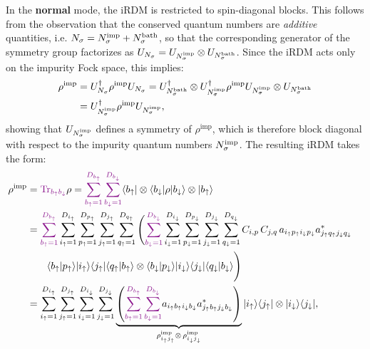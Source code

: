 \documentclass[edipack_sp.tex]{subfiles}
\begin{document}
In the {\bf normal} mode, the iRDM is restricted to 
{spin-diagonal} blocks. This follows from the observation 
that the conserved quantum numbers are 
\emph{additive} quantities, i.e. 
$N_\sigma = N_\sigma^\mathrm{imp} + N_\sigma^\mathrm{bath}$,
so that the corresponding generator of the symmetry group factorizes as
$U_{N_\sigma} = U_{N_\sigma^\mathrm{imp}} \otimes U_{N_\sigma^\mathrm{bath}}$. 
Since the iRDM acts only on the impurity Fock space, this implies:
\begin{equation}
\begin{aligned}
\rho^\mathrm{imp} &= U_{N_\sigma}^\dagger \rho^\mathrm{imp} U_{N_\sigma} = 
U_{N_\sigma^\mathrm{bath}}^\dagger \otimes U_{N_\sigma^\mathrm{imp}}^\dagger 
\rho^\mathrm{imp} 
U_{N_\sigma^\mathrm{imp}} \otimes U_{N_\sigma^\mathrm{bath}} \\
&= 
U_{N_\sigma^\mathrm{imp}}^\dagger \rho^\mathrm{imp} U_{N_\sigma^\mathrm{imp}},
\end{aligned}
\end{equation}
showing that $U_{N_\sigma^\mathrm{imp}}$ defines a symmetry of 
$\rho^\mathrm{imp}$, which is therefore block diagonal with respect to 
the impurity quantum numbers $N_\sigma^\mathrm{imp}$.
The resulting iRDM takes the form:
\begin{equation}
  \label{iRDMnormal}
  \begin{aligned}
  \rho^\mathrm{imp} &= {\color{Plum}\Tr_{b_\up b_\dw}}{\rho} = 
  {\color{Plum}
  \sum_{b_\up=1}^{D_{b_\up}}
  \sum_{b_\dw=1}^{D_{b_\dw}}
  }
  \bra{b_\up}\otimes\bra{b_\dw}
    \rho
    \ket{b_\dw}\otimes\ket{b_\up}    \cr
    &=
    {\color{Plum}
    \sum_{b_\up=1}^{D_{b_\up}}
    }
    \sum_{i_\up=1}^{D_{i_\up}}
    \sum_{p_\up=1}^{D_{p_\up}}
    \sum_{j_\up=1}^{D_{j_\up}} 
    \sum_{q_\up=1}^{D_{q_\up}}
    \Bigg(    
    {\color{Plum}
    \sum_{b_\dw=1}^{D_{b_\dw}}
    }
    \sum_{i_\dw=1}^{D_{i_\dw}}
    \sum_{p_\dw=1}^{D_{p_\dw}}
    \sum_{j_\dw=1}^{D_{j_\dw}} 
    \sum_{q_\dw=1}^{D_{q_\dw}}
    C_{i,p}\,C_{j,q}\,a_{i_\up p_\up i_\dw p_\dw} a^*_{j_\up q_\up j_\dw q_\dw} \cr
    &\qquad    
    \langle b_\up| p_\up\rangle| i_\up\rangle\langle j_\up |\langle q_\up| b_\up\rangle   \otimes \langle b_\dw| p_\dw \rangle|i_\dw\rangle \langle j_\dw  |\langle q_\dw| b_\dw\rangle \Bigg)
    \cr
&=
    \sum_{i_\up=1}^{D_{i_\up}}
    \sum_{j_\up=1}^{D_{j_\up}}
    \sum_{i_\dw=1}^{D_{i_\dw}}
    \sum_{j_\dw=1}^{D_{j_\dw}}
    \underbrace{\left(
    {\color{Plum}
    \sum_{b_\up=1}^{D_{b_\up}}
    \sum_{b_\dw=1}^{D_{b_\dw}}
    }
    a_{i_\up b_\up i_\dw b_\dw} a^*_{j_\up b_\up j_\dw b_\dw}
    \right)}_{\rho^\mathrm{imp}_{i_\up j_\up} \otimes\, \rho^\mathrm{imp}_{i_\dw j_\dw} }
    \ket{i_\up}\bra{j_\up}\otimes \ket{i_\dw}\bra{j_\dw},
  \end{aligned}
\end{equation}
\end{document}
